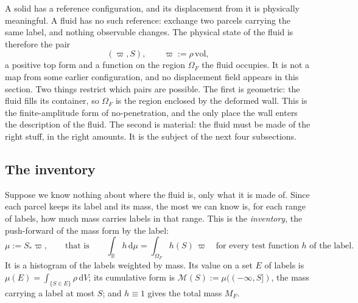 \documentclass[11pt]{article}
\theoremstyle{definition}
\theoremstyle{remark}
\newcommand{\R}{\mathbb{R}}
\newcommand{\dV}{\,\mathrm{d}V}
\newcommand{\Mcdf}{\mathcal M}
\newcommand{\vol}{\mathrm{vol}}
\begin{document}
A solid has a reference configuration, and its displacement from it
is physically meaningful. A fluid has no such reference: exchange two
parcels carrying the same label, and nothing observable changes. The
physical state of the fluid is therefore the pair
\begin{equation*}
  (\varpi, S),\qquad \varpi := \rho\,\vol ,
\end{equation*}
a positive top form and a function on the region $\Omega_F$ the fluid
occupies. It is not a map from some earlier configuration, and no
displacement field appears in this section. Two things restrict which
pairs are possible. The first is geometric: the fluid fills its
container, so $\Omega_F$ is the region enclosed by the deformed wall.
This is the finite-amplitude form of no-penetration, and the only
place the wall enters the description of the fluid. The second is
material: the fluid must be made of the right stuff, in the right
amounts. It is the subject of the next four subsections.

\subsection{The inventory}
\label{sec:inventory}
\label{sec:NL-state}

Suppose we know nothing about where the fluid is, only what it is made
of. Since each parcel keeps its label and its mass, the most we can
know is, for each range of labels, how much mass carries labels in
that range. This is the \emph{inventory}, the push-forward of the mass
form by the label:
\begin{equation}
  \mu := S_*\varpi,\qquad\text{that is}\qquad
  \int_{\R}h\,\mathrm d\mu = \int_{\Omega_F}h(S)\,\varpi
  \quad\text{for every test function $h$ of the label.}
  \label{eq:mu}
\end{equation}
It is a histogram of the labels weighted by mass. Its value on a set
$E$ of labels is $\mu(E) = \int_{\{S\in E\}}\rho\dV$; its cumulative
form is $\Mcdf(S) := \mu((-\infty, S])$, the mass carrying a label at
most $S$; and $h \equiv 1$ gives the total mass $M_F$.
\end{document}
